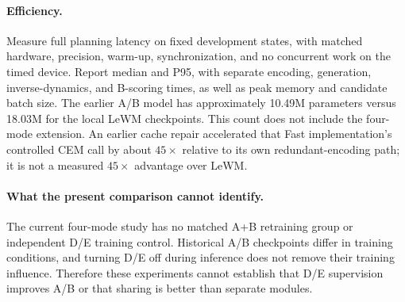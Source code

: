 \paragraph{Efficiency.}
Measure full planning latency on fixed development states, with matched hardware, precision, warm-up, synchronization, and no concurrent work on the timed device. Report median and P95, with separate encoding, generation, inverse-dynamics, and B-scoring times, as well as peak memory and candidate batch size.
The earlier A/B model has approximately 10.49M parameters versus 18.03M for the local LeWM checkpoints. This count does not include the four-mode extension. An earlier cache repair accelerated that Fast implementation's controlled CEM call by about $45\times$ relative to its own redundant-encoding path; it is not a measured $45\times$ advantage over LeWM.

\paragraph{What the present comparison cannot identify.}
The current four-mode study has no matched A+B retraining group or independent D/E training control. Historical A/B checkpoints differ in training conditions, and turning D/E off during inference does not remove their training influence. Therefore these experiments cannot establish that D/E supervision improves A/B or that sharing is better than separate modules.
